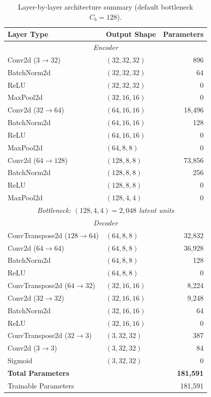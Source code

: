 \documentclass[runningheads]{llncs}
\begin{document}
\begin{table}[H]
\centering
\caption{Layer-by-layer architecture summary (default bottleneck $C_b = 128$).}
\label{tab:arch_summary}
\begin{tabular}{llr}
\toprule
\textbf{Layer Type} & \textbf{Output Shape} & \textbf{Parameters} \\
\midrule
\multicolumn{3}{c}{\textit{Encoder}} \\
\midrule
Conv2d ($3 \to 32$)       & $(32, 32, 32)$  & 896 \\
BatchNorm2d               & $(32, 32, 32)$  & 64 \\
ReLU                      & $(32, 32, 32)$  & 0 \\
MaxPool2d                 & $(32, 16, 16)$  & 0 \\
Conv2d ($32 \to 64$)      & $(64, 16, 16)$  & 18{,}496 \\
BatchNorm2d               & $(64, 16, 16)$  & 128 \\
ReLU                      & $(64, 16, 16)$  & 0 \\
MaxPool2d                 & $(64, 8, 8)$    & 0 \\
Conv2d ($64 \to 128$)     & $(128, 8, 8)$   & 73{,}856 \\
BatchNorm2d               & $(128, 8, 8)$   & 256 \\
ReLU                      & $(128, 8, 8)$   & 0 \\
MaxPool2d                 & $(128, 4, 4)$   & 0 \\
\midrule
\multicolumn{3}{c}{\textit{Bottleneck: $(128, 4, 4) = 2{,}048$ latent units}} \\
\midrule
\multicolumn{3}{c}{\textit{Decoder}} \\
\midrule
ConvTranspose2d ($128 \to 64$) & $(64, 8, 8)$    & 32{,}832 \\
Conv2d ($64 \to 64$)           & $(64, 8, 8)$    & 36{,}928 \\
BatchNorm2d                    & $(64, 8, 8)$    & 128 \\
ReLU                           & $(64, 8, 8)$    & 0 \\
ConvTranspose2d ($64 \to 32$)  & $(32, 16, 16)$  & 8{,}224 \\
Conv2d ($32 \to 32$)           & $(32, 16, 16)$  & 9{,}248 \\
BatchNorm2d                    & $(32, 16, 16)$  & 64 \\
ReLU                           & $(32, 16, 16)$  & 0 \\
ConvTranspose2d ($32 \to 3$)   & $(3, 32, 32)$   & 387 \\
Conv2d ($3 \to 3$)             & $(3, 32, 32)$   & 84 \\
Sigmoid                        & $(3, 32, 32)$   & 0 \\
\midrule
\multicolumn{2}{l}{\textbf{Total Parameters}} & \textbf{181{,}591} \\
\multicolumn{2}{l}{Trainable Parameters}      & 181{,}591 \\
\bottomrule
\end{tabular}
\end{table}
\end{document}
